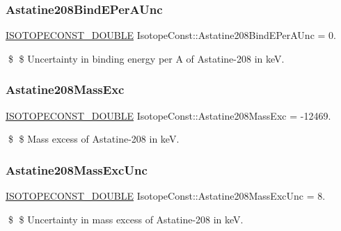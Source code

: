 \subsubsection{\texorpdfstring{Astatine208\+Bind\+E\+Per\+A\+Unc}{Astatine208BindEPerAUnc}}
{\footnotesize\ttfamily \mbox{\hyperlink{group___isotope_const-_macros_ga8f45a7272ce02c0b4c65c44636ed719a}{I\+S\+O\+T\+O\+P\+E\+C\+O\+N\+S\+T\+\_\+\+D\+O\+U\+B\+LE}} Isotope\+Const\+::\+Astatine208\+Bind\+E\+Per\+A\+Unc = 0.}

\$ \$ Uncertainty in binding energy per A of Astatine-\/208 in keV. \mbox{\label{group___isotope_const-_astatine-_at208_ga22e50bf466d07045869b0fca3bf87e0b}} 
\subsubsection{\texorpdfstring{Astatine208\+Mass\+Exc}{Astatine208MassExc}}
{\footnotesize\ttfamily \mbox{\hyperlink{group___isotope_const-_macros_ga8f45a7272ce02c0b4c65c44636ed719a}{I\+S\+O\+T\+O\+P\+E\+C\+O\+N\+S\+T\+\_\+\+D\+O\+U\+B\+LE}} Isotope\+Const\+::\+Astatine208\+Mass\+Exc = -\/12469.}

\$ \$ Mass excess of Astatine-\/208 in keV. \mbox{\label{group___isotope_const-_astatine-_at208_ga62f9965dbf43196bc956df026e449697}} 
\subsubsection{\texorpdfstring{Astatine208\+Mass\+Exc\+Unc}{Astatine208MassExcUnc}}
{\footnotesize\ttfamily \mbox{\hyperlink{group___isotope_const-_macros_ga8f45a7272ce02c0b4c65c44636ed719a}{I\+S\+O\+T\+O\+P\+E\+C\+O\+N\+S\+T\+\_\+\+D\+O\+U\+B\+LE}} Isotope\+Const\+::\+Astatine208\+Mass\+Exc\+Unc = 8.}

\$ \$ Uncertainty in mass excess of Astatine-\/208 in keV. \mbox{\label{group___isotope_const-_astatine-_at208_ga2466c382bd3533863ec91e6966726ab2}} 
